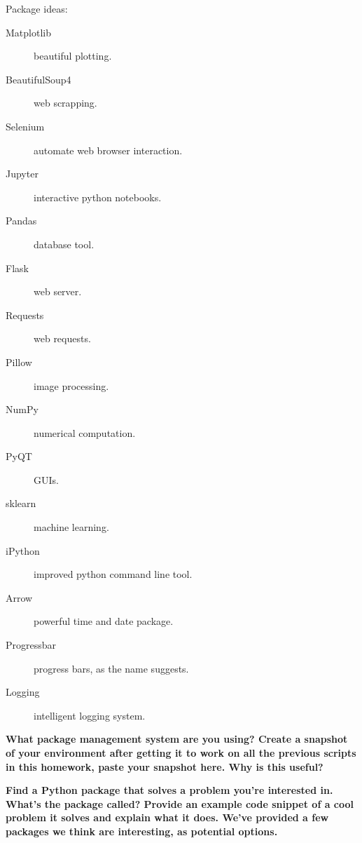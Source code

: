 \documentclass{article}
\begin{document}
\noindent Package ideas:
\begin{description}
  \item[Matplotlib] beautiful plotting.
  \item[BeautifulSoup4] web scrapping. 
  \item[Selenium] automate web browser interaction.
  \item[Jupyter] interactive python notebooks.
  \item[Pandas] database tool.
  \item[Flask] web server.
  \item[Requests] web requests.
  \item[Pillow] image processing.
  \item[NumPy] numerical computation.
  \item[PyQT] GUIs.
  \item[sklearn] machine learning.
  \item[iPython] improved python command line tool.
  \item[Arrow] powerful time and date package.
  \item[Progressbar] progress bars, as the name suggests.
  \item[Logging] intelligent logging system.
\end{description}
\vspace{2cm}

\newpage
\textbf{What package management system are you using? Create a snapshot of your environment after getting it to work on all the previous scripts in this homework, paste your snapshot here. Why is this useful?}
\vspace{9cm}

\textbf{Find a Python package that solves a problem you're interested in. What's the package called? Provide an example code snippet of a cool problem it solves and explain what it does. We've provided a few packages we think are interesting, as potential options.}
\vspace{9cm}
\end{document}
